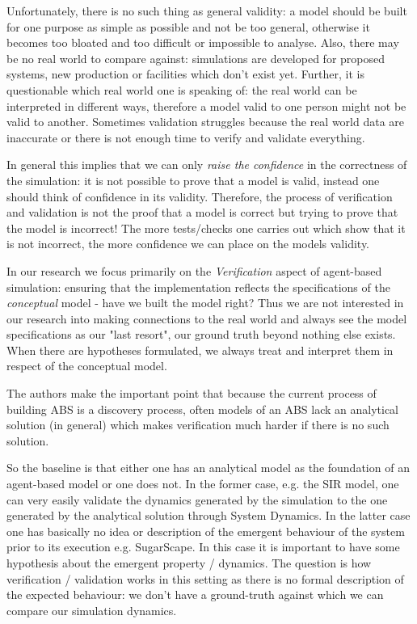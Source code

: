 Unfortunately, there is no such thing as general validity: a model should be built for one purpose as simple as possible and not be too general, otherwise it becomes too bloated and too difficult or impossible to analyse. Also, there may be no real world to compare against: simulations are developed for proposed systems, new production or facilities which don't exist yet. Further, it is questionable which real world one is speaking of: the real world can be interpreted in different ways, therefore a model valid to one person might not be valid to another. Sometimes validation struggles because the real world data are inaccurate or there is not enough time to verify and validate everything.

In general this implies that we can only \textit{raise the confidence} in the correctness of the simulation: it is not possible to prove that a model is valid, instead one should think of confidence in its validity. Therefore, the process of verification and validation is not the proof that a model is correct but trying to prove that the model is incorrect! The more tests/checks one carries out which show that it is not incorrect, the more confidence we can place on the models validity.

In our research we focus primarily on the \textit{Verification} aspect of agent-based simulation: ensuring that the implementation reflects the specifications of the \textit{conceptual} model - have we built the model right? Thus we are not interested in our research into making connections to the real world and always see the model specifications as our "last resort", our ground truth beyond nothing else exists. When there are hypotheses formulated, we always treat and interpret them in respect of the conceptual model.

The authors \cite{ormerod_validation_2006} make the important point that because the current process of building ABS is a discovery process, often models of an ABS lack an analytical solution (in general) which makes verification much harder if there is no such solution.

So the baseline is that either one has an analytical model as the foundation of an agent-based model or one does not. In the former case, e.g. the SIR model, one can very easily validate the dynamics generated by the simulation to the one generated by the analytical solution through System Dynamics. In the latter case one has basically no idea or description of the emergent behaviour of the system prior to its execution e.g. SugarScape. In this case it is important to have some hypothesis about the emergent property / dynamics. The question is how verification / validation works in this setting as there is no formal description of the expected behaviour: we don't have a ground-truth against which we can compare our simulation dynamics.

